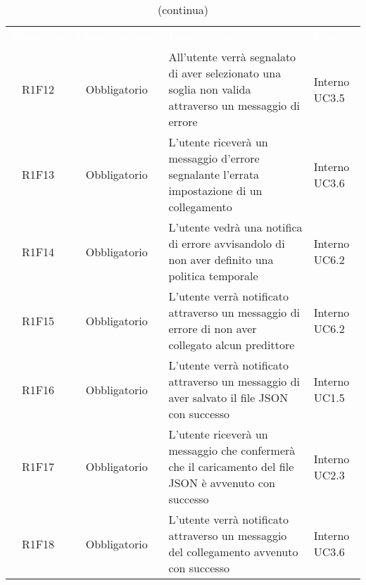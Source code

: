 \begin{table}[H]
\centering\renewcommand{\arraystretch}{1.5}
\caption{(continua)}
\vspace{0.2cm}
\begin{tabular}{ c  c  p{4 cm} C{2.5 cm} }
\textcolor{white}{\textbf{Requisito}} & \textcolor{white}{\textbf{Classificazione}} & 
\textcolor{white}{\textbf{Descrizione}} & \textcolor{white}{\textbf{Fonti}} \\
R1F12 & Obbligatorio & All’utente verrà segnalato di aver selezionato una soglia non valida attraverso un messaggio di errore &  Interno
UC3.5\\
R1F13 & Obbligatorio & 
L’utente riceverà un messaggio d’errore segnalante l’errata impostazione di un collegamento & Interno UC3.6\\
R1F14 & Obbligatorio & L’utente vedrà una notifica di errore avvisandolo di non aver definito una politica temporale &  Interno UC6.2\\
R1F15 & Obbligatorio & L’utente verrà notificato attraverso un messaggio di errore di non aver collegato alcun predittore  &  Interno
UC6.2\\
R1F16 & Obbligatorio & L’utente verrà notificato attraverso un messaggio di aver salvato il file JSON con successo  & Interno UC1.5\\
R1F17 & Obbligatorio & L’utente riceverà un messaggio che confermerà che il caricamento del file JSON è avvenuto con successo &  Interno UC2.3\\
R1F18 & Obbligatorio & L’utente verrà notificato attraverso un messaggio del collegamento avvenuto con successo &  Interno
UC3.6\\
\end{tabular}
\end{table}

